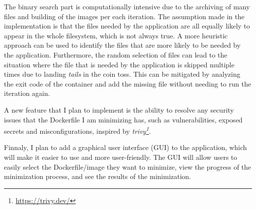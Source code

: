 The binary search part is computationally intensive due to the archiving of many files and building of the images per each iteration.
The assumption made in the implementation is that the files needed by the application are all equally likely to appear in the whole filesystem, which is not always true.
A more heuristic approach can be used to identify the files that are more likely to be needed by the application. Furthermore, the random selection of files can lead to the situation
where the file that is needed by the application is skipped multiple times due to landing \textit{tails} in the coin toss. This can be mitigated by analyzing the exit code of the container and add the missing file
without needing to run the iteration again. 

A new feature that I plan to implement is the ability to resolve any security issues that the Dockerfile I am minimizing has, such as vulnerabilities, exposed secrets and misconfigurations,
inspired by \textit{trivy\footnote[4]{\url{https://trivy.dev/}}}.

Finnaly, I plan to add a graphical user interface (GUI) to the application, which will make it easier to use and more user-friendly.
The GUI will allow users to easily select the Dockerfile/image they want to minimize, view the progress of the minimization process, and see the results of the minimization.